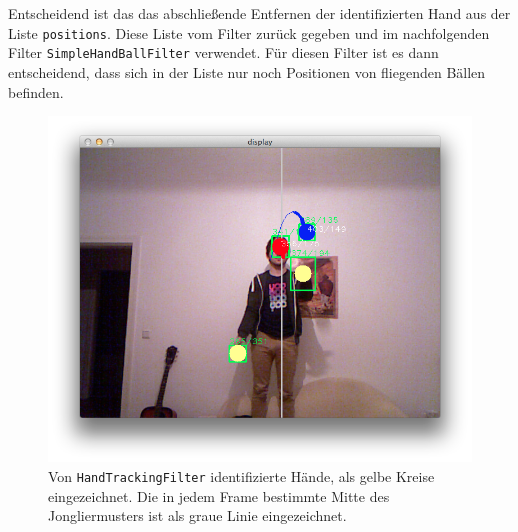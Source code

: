 \documentclass[12pt,a4paper,ngerman]{scrartcl}
\begin{document}
Entscheidend ist das das abschließende Entfernen der identifizierten Hand aus der
Liste \lstinline{positions}. Diese Liste vom Filter zurück gegeben und im
nachfolgenden Filter \lstinline{SimpleHandBallFilter} verwendet. Für diesen Filter
ist es dann entscheidend, dass sich in der Liste nur noch Positionen von fliegenden
Bällen befinden.



\begin{figure}[H]
    \centering
    \includegraphics[scale=0.45]{img/handtracking-2.png}
    \vspace{-0.5cm}
    \caption{Von \lstinline{HandTrackingFilter} identifizierte Hände, als gelbe Kreise eingezeichnet. Die in jedem Frame bestimmte Mitte des Jongliermusters ist als graue Linie eingezeichnet.}
    \label{rects-1}
\end{figure}


\end{document}
